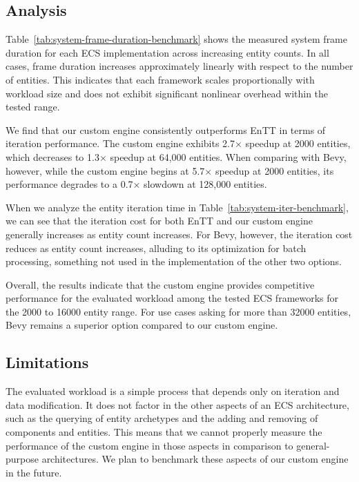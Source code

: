 \subsection{Analysis}
\label{subsec:analysis}

Table~\ref{tab:system-frame-duration-benchmark} shows the measured system frame duration for each ECS implementation
across increasing entity counts.
In all cases, frame duration increases approximately linearly with respect to the number of entities.
This indicates that each framework scales proportionally with workload size and does not exhibit
significant nonlinear overhead within the tested range.

We find that our custom engine consistently outperforms EnTT in terms of iteration performance.
The custom engine exhibits 2.7× speedup at 2000 entities, which decreases to 1.3× speedup at 64,000 entities.
When comparing with Bevy, however, while the custom engine begins at 5.7× speedup at 2000 entities,
its performance degrades to a 0.7× slowdown at 128,000 entities.

When we analyze the entity iteration time in Table~\ref{tab:system-iter-benchmark}, we can see that the iteration cost for
both EnTT and our custom engine generally increases as entity count increases.
For Bevy, however, the iteration cost reduces as entity count increases, alluding to its optimization for batch processing,
something not used in the implementation of the other two options.

Overall, the results indicate that the custom engine provides competitive performance for the evaluated
workload among the tested ECS frameworks for the 2000 to 16000 entity range.
For use cases asking for more than 32000 entities, Bevy remains a superior option compared to our custom engine.

\subsection{Limitations}
\label{subsec:limitations-and-lessons}

The evaluated workload is a simple process that depends only on iteration and data modification.
It does not factor in the other aspects of an ECS architecture, such as the querying of entity archetypes and
the adding and removing of components and entities.
This means that we cannot properly measure the performance of the custom engine in those aspects in comparison to
general-purpose architectures.
We plan to benchmark these aspects of our custom engine in the future\@.